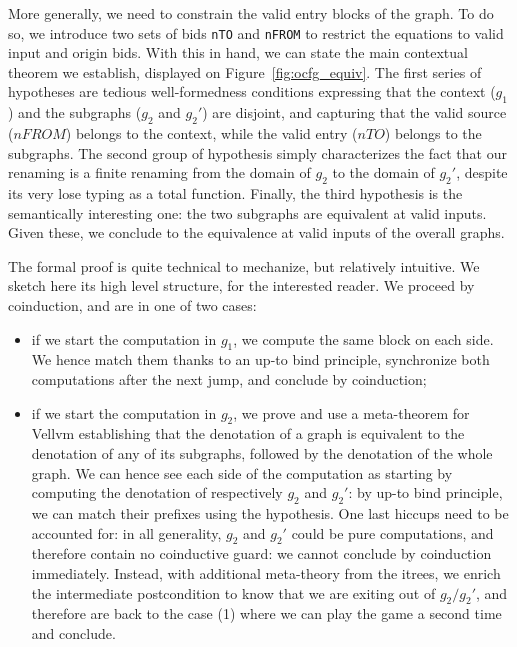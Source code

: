 \documentclass[11pt]{article}
\newcommand{\inlinecoq}[1]{\mbox{\lstinline[style=customcoq,columns=fixed,basewidth=.48em]{#1}}}
\newcommand{\ilc}[1]{\inlinecoq{#1}}
\begin{document}
More generally, we need to constrain the valid entry blocks of the graph. 
To do so, we introduce two sets of bids \ilc{nTO} and \ilc{nFROM} to restrict the equations to valid input and origin bids.
With this in hand, we can state the main contextual theorem we establish, displayed on Figure~\ref{fig:ocfg_equiv}.
The first series of hypotheses are tedious well-formedness conditions expressing that the context ($g_1$) and the subgraphs ($g_2$ and $g_2'$) are disjoint,
and capturing that the valid source ($nFROM$) belongs to the context, while the valid entry ($nTO$) belongs to the subgraphs.
The second group of hypothesis simply characterizes the fact that our renaming is a finite renaming from the domain of $g_2$ to the domain of $g_2'$, despite its very lose typing as a total function.
Finally, the third hypothesis is the semantically interesting one: the two subgraphs are equivalent at valid inputs.
Given these, we conclude to the equivalence at valid inputs of the overall graphs.

The formal proof is quite technical to mechanize, but relatively intuitive. We sketch here its high level structure, for the interested reader. We proceed by coinduction, and are in one of two cases:
\begin{itemize}
\item if we start the computation in $g_1$, we compute the same block on each side. We hence match them thanks to an up-to bind principle, synchronize both computations after the next jump, and conclude by coinduction;
\item if we start the computation in $g_2$, we prove and use a meta-theorem for Vellvm establishing that the denotation of a graph is equivalent to the denotation of any of its subgraphs, followed by the denotation of the whole graph. We can hence see each side of the computation as starting by computing the denotation of respectively $g_2$ and $g_2'$: by up-to bind principle, we can match their prefixes using the hypothesis. One last hiccups need to be accounted for: in all generality, $g_2$ and $g_2'$ could be pure computations, and therefore contain no coinductive guard: we cannot conclude by coinduction immediately.
Instead, with additional meta-theory from the itrees, we enrich the intermediate postcondition to know that we are exiting out of $g_2/g_2'$, and therefore are back to the case (1) where we can play the game a second time and conclude.
\end{itemize}

\end{document}
